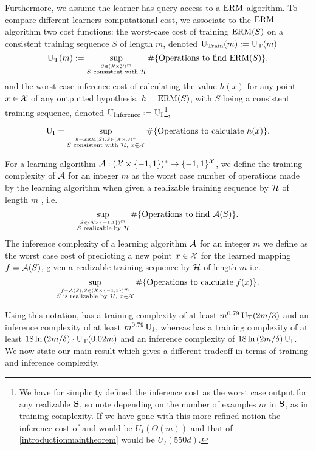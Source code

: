 Furthermore, we assume the learner has query access to a $ \mathrm{ERM} $-algorithm. To compare different learners computational cost, we associate to the $ \mathrm{ERM} $ algorithm two cost functions: the worst-case cost of training $ \mathrm{ERM}(S) $  on a consistent training sequence $ S $ of length $ m $, denoted  $ \text{U}_{\text{Train}}(m):=\operatorname{U_{T}}(m)$
$$\operatorname{U_{T}}(m):=\sup_{\stackrel{S\in (\mathcal{X}\times\mathcal{Y})^{m}}{S \text{ consistent with } \mathcal{H}}} \# \{ \text{Operations to}\text{ find } \mathrm{ERM}(S)  \},$$
and the worst-case inference cost of calculating the value $ h(x) $  for any point $ x\in \mathcal{X} $ of any outputted hypothesis, $ h=\mathrm{ERM}(S) $, with $ S $ being a consistent training sequence,  denoted  $ \text{U}_{\text{Inference}}:= \operatorname{U_{I}}$\footnote{We have for simplicity defined the inference cost as the worst case output for any realizable $ \mathbf{S} $, so note depending on the number of examples $  m$  in $ \mathbf{S} $, as in training complexity. If we have gone with this more refined notion the inference cost of \cite{hannekeoptimal} and \cite{baggingoptimalPAClearner} would be $ U_{I}(\Theta(m)) $ and that of \cref{introductionmaintheorem} would be $ U_{I}(550d). $    },

$$\operatorname{U_{I}}=\sup_{\stackrel{h=\mathrm{ERM}(S), S\in (\mathcal{X}\times\mathcal{Y})^{*}}{S \text{ consistent with } \mathcal{H},\text{ }x\in\mathcal{X}}} \# \{ \text{Operations to calculate } h(x)  \}.$$

For a learning algorithm $ \mathcal{A}:(\mathcal{X}\times \{ -1,1 \} )^{*}\rightarrow \{ -1,1 \}^{\mathcal{X}} $, we define the training complexity of $ \mathcal{A} $ for an integer $ m $ as the worst case number of operations made by the learning algorithm when given a realizable training sequence by $ \mathcal{H} $ of length $ m $ , i.e.  $$\sup_{\stackrel{S\in(\mathcal{X}\times \{-1,1\})^{m}}{ S \text{ realizable by } \mathcal{H}  }} \# \{\text{Operations to find } \mathcal{A}(S)\}.$$ The inference complexity of a learning algorithm $ \mathcal{A} $ for an integer $ m $ we define as the worst case cost of predicting a new point $ x\in \mathcal{X} $ for the learned mapping $f= \mathcal{A}(S) $, given a realizable training sequence by $ \mathcal{H} $ of length $ m $   i.e. $$ \sup_{\stackrel{f=\mathcal{A}(S),S\in (\mathcal{X}\times \{-1,1\})^{m}}{ S \text{ is realizable by } \mathcal{H}, \text{ } x\in \mathcal{X}}} \#\{\text{Operations to calculate } f(x)\}.$$


Using this notation, \cite{hannekeoptimal} has a training complexity of at least $ m^{0.79}\operatorname{U_{T}}(2m/3) $ and an inference complexity of at least $ m^{0.79}\operatorname{U_{I}} $, whereas \cite{baggingoptimalPAClearner} has a training complexity of at least $ 18\ln{\left(2m/\delta \right)}\cdot\operatorname{U_{T}}(0.02m) $ and an inference complexity of $ 18\ln{\left(2m/\delta \right)}\operatorname{U_{I}}$. We now state our main result which gives a different tradeoff in terms of training and inference complexity.

